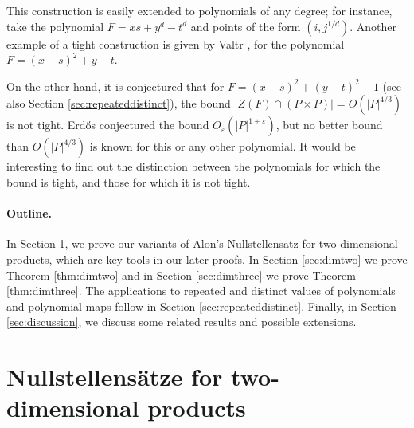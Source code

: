 \documentclass{daj}
\theoremstyle{definition}
\newcommand{\eps}{\varepsilon}
\begin{document}

This construction is easily extended to polynomials of any degree; 
for instance, take the polynomial $F=xs+y^d-t^d$
and points of the form $(i,j^{1/d})$.
Another example of a tight construction is given by Valtr \cite{V}, for the polynomial $F = (x-s)^2+y-t$.


On the other hand, it is conjectured that for $F = (x-s)^2 + (y-t)^2 -1$ (see also Section \ref{sec:repeateddistinct}),
the bound $|Z(F)\cap (P\times P)| = O(|P|^{4/3})$ is not tight.
Erd\H os \cite{Er} conjectured the bound $O_\eps(|P|^{1+\eps})$, but no better bound than $O(|P|^{4/3})$ is known for this or any other polynomial.
It would be interesting to find out the distinction between the polynomials for which the bound is tight, and those for which it is not tight.



\paragraph{Outline.}
In Section \ref{sec:null}, we prove our variants of Alon's Nullstellensatz for two-dimensional products, which are key tools in our later proofs.
In Section \ref{sec:dimtwo} we prove Theorem \ref{thm:dimtwo} and in Section \ref{sec:dimthree} we prove Theorem \ref{thm:dimthree}.
The applications to repeated and distinct values of polynomials and polynomial maps follow in Section \ref{sec:repeateddistinct}.
Finally, in Section \ref{sec:discussion}, we discuss some related results and possible extensions.





\section{Nullstellens\"atze for two-dimensional products}
\label{sec:null}
\end{document}
